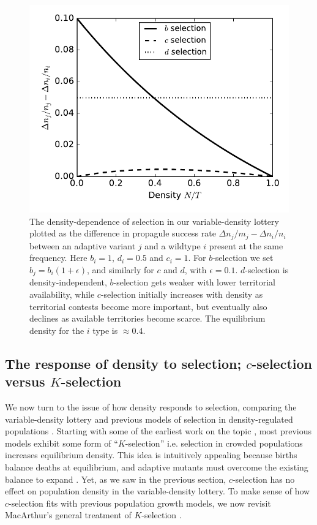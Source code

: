 \documentclass[12pt]{article}
\begin{document}
\begin{figure}
\centering
\includegraphics[scale=0.8]{DDS_lottery.pdf}
\caption{\label{fig:DDS_lottery} The density-dependence of selection in our variable-density lottery plotted as the difference in propagule success rate $\Delta n_j/m_j-\Delta n_i/n_i$ between an adaptive variant $j$ and a wildtype $i$ present at the same frequency. Here $b_i=1$, $d_i=0.5$ and $c_i=1$. For $b$-selection we set $b_j=b_i(1+\epsilon)$, and similarly for $c$ and $d$, with $\epsilon=0.1$. $d$-selection is density-independent, $b$-selection gets weaker with lower territorial availability, while $c$-selection initially increases with density as territorial contests become more important, but eventually also declines as  available territories become scarce. The equilibrium density for the $i$ type is $\approx 0.4$.}
\end{figure}

\subsection*{The response of density to selection; $c$-selection versus $K$-selection}

We now turn to the issue of how density responds to selection, comparing the variable-density lottery and previous models of selection in density-regulated populations  \citep{prout_1980}. Starting with some of the earliest work on the topic \citep{kostitzin_1939,christiansen_2004}, most previous models exhibit some form of ``$K$-selection'' i.e. selection in crowded populations increases equilibrium density. This idea is intuitively appealing because births balance deaths at equilibrium, and adaptive mutants must overcome the existing balance to expand \citep[pp. 227]{kostitzin_1939}. Yet, as we saw in the previous section, $c$-selection has no effect on population density in the variable-density lottery. To make sense of how $c$-selection fits with previous population growth models, we now revisit MacArthur's general treatment of $K$-selection \citep{macarthur_1967}.
\end{document}
